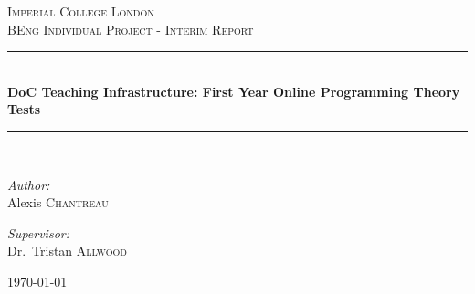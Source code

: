 \documentclass[11pt,a4paper]{report}
\newcommand{\HRule}{\rule{\linewidth}{0.5mm}}
\begin{document}
\begin{titlepage}
\begin{center}

\textsc{\LARGE Imperial College London}\\[1.5cm]

\textsc{\Large BEng Individual Project - Interim Report}\\[0.5cm]

\HRule \\[0.4cm]
{ \huge \bfseries DoC Teaching Infrastructure: First Year Online Programming Theory Tests \\[0.4cm] }

\HRule \\[1.5cm]

\begin{minipage}{0.4\textwidth}
\begin{flushleft} \large
\emph{Author:}\\
Alexis \textsc{Chantreau}
\end{flushleft}
\end{minipage}
\begin{minipage}{0.4\textwidth}
\begin{flushright} \large
\emph{Supervisor:} \\
Dr.~Tristan \textsc{Allwood}
\end{flushright}
\end{minipage}

\vfill

{\large \today}

\end{center}
\end{titlepage}

%


\tableofcontents

\newpage
\setcounter{page}{1}
\end{document}
